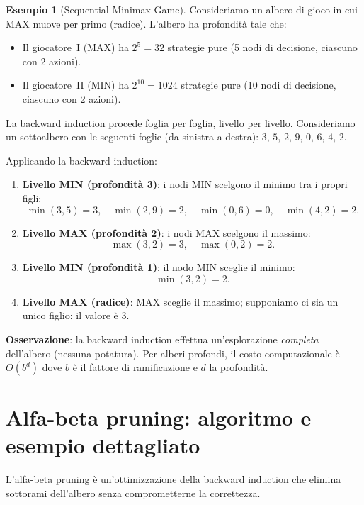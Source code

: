 \documentclass[12pt,a4paper,twoside]{book}
\theoremstyle{plain}
\theoremstyle{definition}
\newtheorem{example}[theorem]{Esempio}
\begin{document}
\begin{example}[Sequential Minimax Game]
Consideriamo un albero di gioco in cui MAX muove per primo (radice). L'albero ha profondità tale che:
\begin{itemize}
  \item Il giocatore~I (MAX) ha $2^5 = 32$ strategie pure (5 nodi di decisione, ciascuno con 2 azioni).
  \item Il giocatore~II (MIN) ha $2^{10} = 1024$ strategie pure (10 nodi di decisione, ciascuno con 2 azioni).
\end{itemize}
La backward induction procede foglia per foglia, livello per livello. Consideriamo un sottoalbero con le seguenti foglie (da sinistra a destra): $3,\,5,\,2,\,9,\,0,\,6,\,4,\,2$.

Applicando la backward induction:
\begin{enumerate}
  \item \textbf{Livello MIN (profondità 3)}: i nodi MIN scelgono il minimo tra i propri figli:
    \[\min(3,5)=3,\quad \min(2,9)=2,\quad \min(0,6)=0,\quad \min(4,2)=2.\]
  \item \textbf{Livello MAX (profondità 2)}: i nodi MAX scelgono il massimo:
    \[\max(3,2)=3,\quad \max(0,2)=2.\]
  \item \textbf{Livello MIN (profondità 1)}: il nodo MIN sceglie il minimo:
    \[\min(3,2)=2.\]
  \item \textbf{Livello MAX (radice)}: MAX sceglie il massimo; supponiamo ci sia un unico figlio: il valore è $\boxed{3}$.
\end{enumerate}

\textbf{Osservazione}: la backward induction effettua un'esplorazione \emph{completa} dell'albero (nessuna potatura). Per alberi profondi, il costo computazionale è $O(b^d)$ dove $b$ è il fattore di ramificazione e $d$ la profondità.
\end{example}

\section{Alfa-beta pruning: algoritmo e esempio dettagliato}

L'alfa-beta pruning è un'ottimizzazione della backward induction che elimina sottorami dell'albero senza comprometterne la correttezza.
\end{document}
